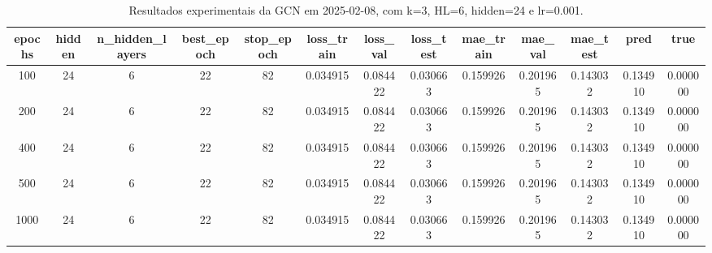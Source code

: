 \begin{table}[h]
\centering
\caption{Resultados experimentais da GCN em 2025-02-08, com k=3, HL=6, hidden=24 e lr=0.001.}
\label{tab:gcn_results_k3_hl6_h24_d20250208}
\begin{tabular}{ccccccccccccc}
\toprule
epochs & hidden & n\_hidden\_layers & best\_epoch & stop\_epoch & loss\_train & loss\_val & loss\_test & mae\_train & mae\_val & mae\_test & pred & true \\
\midrule
100 & 24 & 6 & 22 & 82 & 0.034915 & 0.084422 & 0.030663 & 0.159926 & 0.201965 & 0.143032 & 0.134910 & 0.000000 \\
200 & 24 & 6 & 22 & 82 & 0.034915 & 0.084422 & 0.030663 & 0.159926 & 0.201965 & 0.143032 & 0.134910 & 0.000000 \\
400 & 24 & 6 & 22 & 82 & 0.034915 & 0.084422 & 0.030663 & 0.159926 & 0.201965 & 0.143032 & 0.134910 & 0.000000 \\
500 & 24 & 6 & 22 & 82 & 0.034915 & 0.084422 & 0.030663 & 0.159926 & 0.201965 & 0.143032 & 0.134910 & 0.000000 \\
1000 & 24 & 6 & 22 & 82 & 0.034915 & 0.084422 & 0.030663 & 0.159926 & 0.201965 & 0.143032 & 0.134910 & 0.000000 \\
\bottomrule
\end{tabular}
\end{table}
